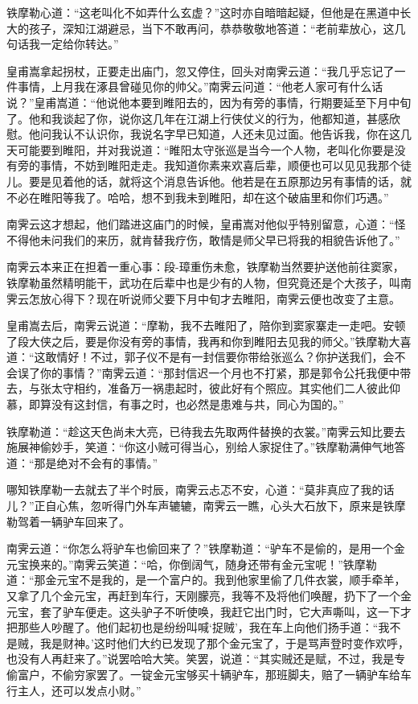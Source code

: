 \documentclass[12pt,oneside]{book}
\begin{document}
铁摩勒心道：``这老叫化不如弄什么玄虚？''这时亦自暗暗起疑，但他是在黑道中长大的孩子，深知江湖避忌，当下不敢再问，恭恭敬敬地答道：``老前辈放心，这几句话我一定给你转达。''

皇甫嵩拿起拐杖，正要走出庙门，忽又停住，回头对南霁云道：``我几乎忘记了一件事情，上月我在涿县曾碰见你的帅父。''南霁云问道：``他老人家可有什么话说？''皇甫嵩道：``他说他本要到睢阳去的，因为有旁的事情，行期要延至下月中旬了。他和我谈起了你，说你这几年在江湖上行侠仗义的行为，他都知道，甚感欣慰。他问我认不认识你，我说名字早已知道，人还未见过面。他告诉我，你在这几天可能要到睢阳，并对我说道：``睢阳太守张巡是当今一个人物，老叫化你要是没有旁的事情，不妨到睢阳走走。我知道你素来欢喜后辈，顺便也可以见见我那个徒儿。要是见着他的话，就将这个消息告诉他。他若是在五原那边另有事情的话，就不必在睢阳等我了。哈哈，想不到我未到睢阳，却在这个破庙里和你们巧遇。''

南霁云这才想起，他们踏进这庙门的时候，皇甫嵩对他似乎特别留意，心道：``怪不得他未问我们的来历，就肯替我疗伤，敢情是师父早已将我的相貌告诉他了。''

南霁云本来正在担着一重心事：段-璋重伤未愈，铁摩勒当然要护送他前往窦家，铁摩勒虽然精明能干，武功在后辈中也是少有的人物，但究竟还是个大孩子，叫南霁云怎放心得下？现在听说师父要下月中旬才去睢阳，南霁云便也改变了主意。

皇甫嵩去后，南霁云说道：``摩勒，我不去睢阳了，陪你到窦家寨走一走吧。安顿了段大侠之后，要是你没有旁的事情，我再和你到睢阳去见我的师父。''铁摩勒大喜道：``这敢情好！不过，郭子仪不是有一封信要你带给张巡么？你护送我们，会不会误了你的事情？''南霁云道：``那封信迟一个月也不打紧，那是郭令公托我便中带去，与张太守相约，准备万一祸患起时，彼此好有个照应。其实他们二人彼此仰慕，即算没有这封信，有事之时，也必然是患难与共，同心为国的。''

铁摩勒道：``趁这天色尚未大亮，已待我去先取两件替换的衣裳。''南霁云知比要去施展神偷妙手，笑道：``你这小贼可得当心，别给人家捉住了。''铁摩勒满伸气地答道：``那是绝对不会有的事情。''

哪知铁摩勒一去就去了半个时辰，南霁云忐忑不安，心道：``莫非真应了我的话儿？''正自心焦，忽听得门外车声辘辘，南霁云一瞧，心头大石放下，原来是铁摩勒驾着一辆驴车回来了。

南霁云道：``你怎么将驴车也偷回来了？''铁摩勒道：``驴车不是偷的，是用一个金元宝换来的。''南霁云笑道：``哈，你倒阔气，随身还带有金元宝呢！''铁摩勒道：``那金元宝不是我的，是一个富户的。我到他家里偷了几件衣裳，顺手牵羊，又拿了几个金元宝，再赶到车行，天刚朦亮，我等不及将他们唤醒，扔下了一个金元宝，套了驴车便走。这头驴子不听使唤，我赶它出门时，它大声嘶叫，这一下才把那些人吵醒了。他们起初也是纷纷叫喊`捉贼'，我在车上向他们扬手道：``我不是贼，我是财神。'这时他们大约已发现了那个金元宝了，于是骂声登时变作欢呼，也没有人再赶来了。''说罢哈哈大笑。笑罢，说道：``其实贼还是赋，不过，我是专偷富户，不偷穷家罢了。一锭金元宝够买十辆驴车，那班脚夫，赔了一辆驴车给车行主人，还可以发点小财。''
\end{document}
